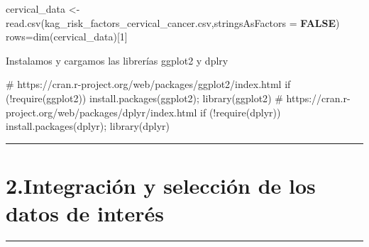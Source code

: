 \documentclass[
]{article}
\newenvironment{Shaded}{\begin{snugshade}}{\end{snugshade}}
\newcommand{\AttributeTok}[1]{\textcolor[rgb]{0.80,0.80,0.80}{#1}}
\newcommand{\CommentTok}[1]{\textcolor[rgb]{0.50,0.62,0.50}{#1}}
\newcommand{\ConstantTok}[1]{\textcolor[rgb]{0.86,0.64,0.64}{\textbf{#1}}}
\newcommand{\ControlFlowTok}[1]{\textcolor[rgb]{0.94,0.87,0.69}{#1}}
\newcommand{\DecValTok}[1]{\textcolor[rgb]{0.86,0.86,0.80}{#1}}
\newcommand{\FunctionTok}[1]{\textcolor[rgb]{0.94,0.94,0.56}{#1}}
\newcommand{\NormalTok}[1]{\textcolor[rgb]{0.80,0.80,0.80}{#1}}
\newcommand{\OtherTok}[1]{\textcolor[rgb]{0.94,0.94,0.56}{#1}}
\newcommand{\SpecialCharTok}[1]{\textcolor[rgb]{0.86,0.64,0.64}{#1}}
\newcommand{\StringTok}[1]{\textcolor[rgb]{0.80,0.58,0.58}{#1}}
\begin{document}
\begin{Shaded}
\begin{Highlighting}[]
\NormalTok{cervical\_data }\OtherTok{\textless{}{-}} \FunctionTok{read.csv}\NormalTok{(}\StringTok{\textquotesingle{}kag\_risk\_factors\_cervical\_cancer.csv\textquotesingle{}}\NormalTok{,}\AttributeTok{stringsAsFactors =} \ConstantTok{FALSE}\NormalTok{)}
\NormalTok{rows}\OtherTok{=}\FunctionTok{dim}\NormalTok{(cervical\_data)[}\DecValTok{1}\NormalTok{]}
\end{Highlighting}
\end{Shaded}

Instalamos y cargamos las librerías ggplot2 y dplry

\begin{Shaded}
\begin{Highlighting}[]
\CommentTok{\# https://cran.r{-}project.org/web/packages/ggplot2/index.html}
\ControlFlowTok{if}\NormalTok{ (}\SpecialCharTok{!}\FunctionTok{require}\NormalTok{(}\StringTok{\textquotesingle{}ggplot2\textquotesingle{}}\NormalTok{)) }\FunctionTok{install.packages}\NormalTok{(}\StringTok{\textquotesingle{}ggplot2\textquotesingle{}}\NormalTok{); }\FunctionTok{library}\NormalTok{(}\StringTok{\textquotesingle{}ggplot2\textquotesingle{}}\NormalTok{)}
\CommentTok{\# https://cran.r{-}project.org/web/packages/dplyr/index.html}
\ControlFlowTok{if}\NormalTok{ (}\SpecialCharTok{!}\FunctionTok{require}\NormalTok{(}\StringTok{\textquotesingle{}dplyr\textquotesingle{}}\NormalTok{)) }\FunctionTok{install.packages}\NormalTok{(}\StringTok{\textquotesingle{}dplyr\textquotesingle{}}\NormalTok{); }\FunctionTok{library}\NormalTok{(}\StringTok{\textquotesingle{}dplyr\textquotesingle{}}\NormalTok{)}
\end{Highlighting}
\end{Shaded}

\begin{center}\rule{0.5\linewidth}{0.5pt}\end{center}

\hypertarget{integraciuxf3n-y-selecciuxf3n-de-los-datos-de-interuxe9s}{%
\section{2.Integración y selección de los datos de
interés}\label{integraciuxf3n-y-selecciuxf3n-de-los-datos-de-interuxe9s}}

\begin{center}\rule{0.5\linewidth}{0.5pt}\end{center}
\end{document}
